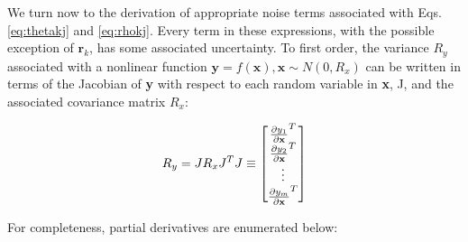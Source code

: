 \documentclass{aiaa-tc}
\newcommand{\B}[1]{\textbf{#1}} %
\begin{document}

We turn now to the derivation of appropriate noise terms associated with Eqs. \ref{eq:thetakj} and \ref{eq:rhokj}. Every term in these expressions, with the possible exception of $\B{r}_k$, has some associated uncertainty. To first order, the variance $R_y$ associated with a nonlinear function $\B{y} = f(\B{x}), \B{x} \sim N(0,R_x)$ can be written in terms of the Jacobian of \B{y} with respect to each random variable in \B{x}, J, and the associated covariance matrix $R_x$:

\begin{equation}
R_y = JR_xJ^T \\
J \equiv \begin{bmatrix}
\frac{ \partial y_1 }{ \partial \B{x} }^T \\
\frac{ \partial y_2 }{ \partial \B{x} }^T \\
\vdots \\
\frac{ \partial y_m }{ \partial \B{x} }^T \\
\end{bmatrix}
\label{eq:covTransf}
\end{equation}

For completeness, partial derivatives are enumerated below:
\end{document}

